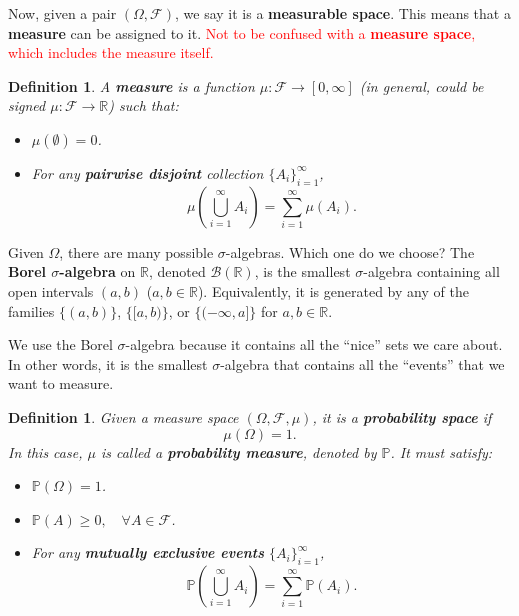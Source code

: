 \documentclass[twoside]{article}
\newcommand{\note}[1]{\textcolor{red}{#1}}
\newtheorem{definition}[theorem]{Definition}
\newcommand\F{\mathcal{F}}
\newcommand{\prob}{\mathbb{P}}
\begin{document}
Now, given a pair $(\Omega,\mathcal{F})$, we say it is a \textbf{measurable space}. This means that a \textbf{measure} can be assigned to it.  
\note{Not to be confused with a \textbf{measure space}, which includes the measure itself.}

\begin{definition}
    A \textbf{measure} is a function $\mu:\mathcal{F}\rightarrow [0,\infty]$ (in general, could be signed $\mu:\mathcal{F}\rightarrow \mathbb{R}$) such that:
    \begin{itemize}
        \item $\mu(\emptyset)=0$.
        \item For any \textbf{pairwise disjoint} collection $\{A_i\}_{i=1}^{\infty}$,
        \[
            \mu\!\left(\bigcup_{i=1}^\infty A_i\right)=\sum_{i=1}^\infty \mu(A_i).
        \]
    \end{itemize}
\end{definition}

Given $\Omega$, there are many possible $\sigma$-algebras. Which one do we choose?  
The \textbf{Borel $\sigma$-algebra} on $\mathbb{R}$, denoted $\mathcal{B}(\mathbb{R})$, is the smallest $\sigma$-algebra containing all open intervals $(a,b)$ ($a,b\in\mathbb{R}$). Equivalently, it is generated by any of the families
$\{(a,b)\}$, $\{[a,b)\}$, or $\{(-\infty,a]\}$ for $a,b\in\mathbb{R}$.

We use the Borel $\sigma$-algebra because it contains all the “nice” sets we care about. In other words, it is the smallest $\sigma$-algebra that contains all the “events” that we want to measure.

\begin{definition}
    Given a measure space $(\Omega,\mathcal{F},\mu)$, it is a \textbf{probability space} if
    $$\mu(\Omega)=1.$$ 
    In this case, $\mu$ is called a \textbf{probability measure}, denoted by $\mathbb{P}$. It must satisfy:
    \begin{itemize}
        \item [(P1)] $\prob(\Omega) = 1$.
        \item [(P2)] $\prob(A)\geq 0, \quad \forall A\in \F$.
        \item [(P3)] For any \textbf{mutually exclusive events} $\{A_i\}_{i=1}^{\infty}$,
        \[
            \prob\!\left(\bigcup_{i=1}^\infty A_i\right)=\sum_{i=1}^\infty \prob(A_i).
        \]
    \end{itemize}
\end{definition}
\end{document}
